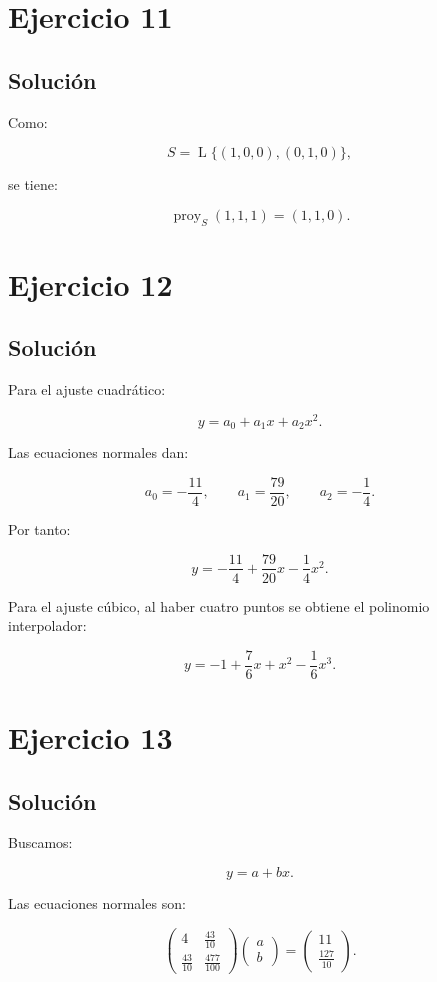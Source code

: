\documentclass[11pt,a4paper]{article}
\newcommand{\Span}{\operatorname{L}}
\newcommand{\proy}{\operatorname{proy}}
\begin{document}
\section{Ejercicio 11}
\subsection{Solución}

Como:

\[
S=
\Span\{(1,0,0),(0,1,0)\},
\]

se tiene:

\[
\boxed{
\proy_S(1,1,1)
=
(1,1,0).
}
\]

\section{Ejercicio 12}
\subsection{Solución}

Para el ajuste cuadrático:

\[
y=a_0+a_1x+a_2x^2.
\]

Las ecuaciones normales dan:

\[
a_0=-\frac{11}{4},
\qquad
a_1=\frac{79}{20},
\qquad
a_2=-\frac14.
\]

Por tanto:

\[
\boxed{
y=
-\frac{11}{4}
+
\frac{79}{20}x
-
\frac14x^2.
}
\]

Para el ajuste cúbico, al haber cuatro puntos se obtiene el polinomio interpolador:

\[
\boxed{
y=
-1
+
\frac76x
+
x^2
-
\frac16x^3.
}
\]

\section{Ejercicio 13}
\subsection{Solución}

Buscamos:

\[
y=a+bx.
\]

Las ecuaciones normales son:

\[
\begin{pmatrix}
4&\frac{43}{10}\\
\frac{43}{10}&\frac{477}{100}
\end{pmatrix}
\begin{pmatrix}
a\\b
\end{pmatrix}
=
\begin{pmatrix}
11\\
\frac{127}{10}
\end{pmatrix}.
\]
\end{document}
